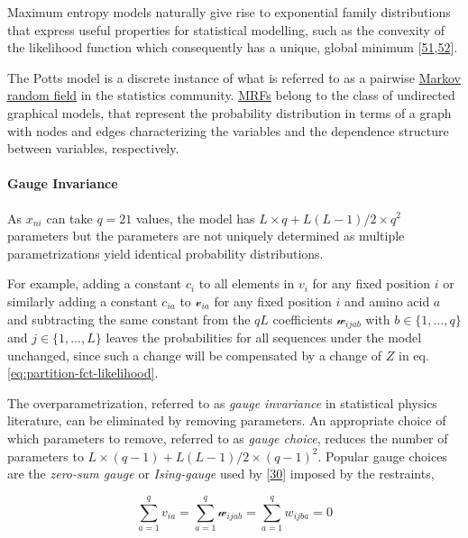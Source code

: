 \documentclass[12pt,a4paper,twoside]{book}
\newcommand{\via}{\mathcal{v}_{ia}}
\newcommand{\wijab}{\mathcal{w}_{ijab}}
\theoremstyle{definition}
\theoremstyle{definition}
\theoremstyle{remark}
\begin{document}
Maximum entropy models naturally give rise to exponential family
distributions that express useful properties for statistical modelling,
such as the convexity of the likelihood function which consequently has
a unique, global minimum
{[}\protect\hyperlink{ref-Wainwright2007}{51},\protect\hyperlink{ref-Murphy2012}{52}{]}.

The Potts model is a discrete instance of what is referred to as a
pairwise \protect\hyperlink{abbrev}{Markov random field} in the
statistics community. \protect\hyperlink{abbrev}{MRFs} belong to the
class of undirected graphical models, that represent the probability
distribution in terms of a graph with nodes and edges characterizing the
variables and the dependence structure between variables, respectively.

\hypertarget{gauge-invariance}{\paragraph{Gauge
Invariance}\label{gauge-invariance}}

As \(x_{ni}\) can take \(q=21\) values, the model has
\(L \! \times \! q + L(L-1)/2 \! \times \! q^2\) parameters but the
parameters are not uniquely determined as multiple parametrizations
yield identical probability distributions.

For example, adding a constant \(c_i\) to all elements in \(v_i\) for
any fixed position \(i\) or similarly adding a constant \(c_{ia}\) to
\(\via\) for any fixed position \(i\) and amino acid \(a\) and
subtracting the same constant from the \(qL\) coefficients \(\wijab\)
with \(b \in \{1, \ldots, q\}\) and \(j \in \{1, \ldots, L \}\) leaves
the probabilities for all sequences under the model unchanged, since
such a change will be compensated by a change of \(Z\) in eq.
\eqref{eq:partition-fct-likelihood}.

The overparametrization, referred to as \emph{gauge invariance} in
statistical physics literature, can be eliminated by removing
parameters. An appropriate choice of which parameters to remove,
referred to as \emph{gauge choice}, reduces the number of parameters to
\(L \! \times \! (q-1) + L(L-1)/2 \! \times \! (q-1)^2\). Popular gauge
choices are the \emph{zero-sum gauge} or \emph{Ising-gauge} used by
{[}\protect\hyperlink{ref-Weigt2009}{30}{]} imposed by the restraints,

\begin{equation}
    \sum_{a=1}^{q} v_{ia} = \sum_{a=1}^{q} \wijab = \sum_{a=1}^{q} w_{ijba} = 0
\label{eq:zero-sum-gauge}
\end{equation}
\end{document}

